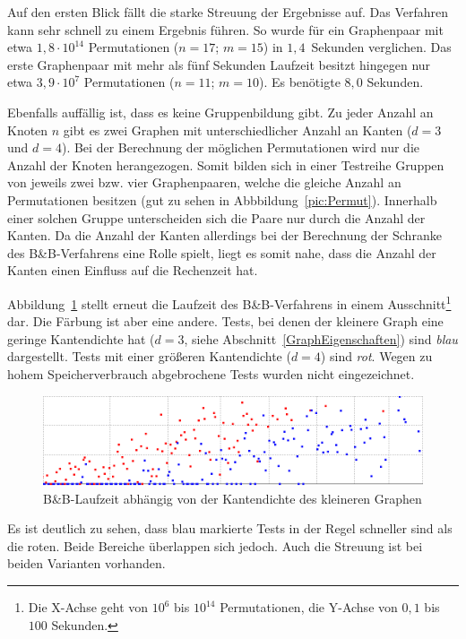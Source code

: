 Auf den ersten Blick fällt die starke Streuung der Ergebnisse auf. Das Verfahren kann 
sehr schnell zu einem Ergebnis führen. So wurde für ein Graphenpaar mit etwa $1{,}8 \cdot 
10^{14}$ Permutationen ($n=17$; $m=15$) in $1{,}4$~Sekunden verglichen. Das erste Graphenpaar 
mit mehr als fünf Sekunden Laufzeit besitzt hingegen nur etwa $3{,}9\cdot 10^7$ 
Permutationen ($n=11$; $m=10$). Es benötigte $8{,}0$ Sekunden. 

Ebenfalls auffällig ist, dass es keine Gruppenbildung gibt. Zu jeder Anzahl an Knoten 
$n$ gibt es zwei Graphen mit unterschiedlicher Anzahl an Kanten ($d=3$ und $d=4$). 
Bei der Berechnung 
der möglichen Permutationen wird nur die Anzahl der Knoten herangezogen. Somit bilden 
sich in einer Testreihe Gruppen von jeweils zwei bzw. vier Graphenpaaren, welche die gleiche  
Anzahl an Permutationen besitzen (gut zu sehen in Abbbildung~\ref{pic:Permut}). Innerhalb 
einer solchen Gruppe unterscheiden sich die Paare nur durch die Anzahl der Kanten.
Da die Anzahl der Kanten allerdings bei der Berechnung der Schranke des B\&B-Verfahrens 
eine Rolle  spielt, liegt es somit nahe, dass die Anzahl der Kanten einen Einfluss auf 
die Rechenzeit hat.

Abbildung~\ref{pic:BBcomp} stellt erneut die Laufzeit des B\&B-Verfahrens in einem 
Ausschnitt\footnote{Die X-Achse geht von $10^6$ bis $10^{14}$ Permutationen, die 
Y-Achse von $0{,}1$ bis $100$ Sekunden.} dar. Die Färbung ist aber eine andere. Tests, 
bei denen der kleinere Graph eine geringe Kantendichte hat ($d=3$, siehe 
Abschnitt~\ref{GraphEigenschaften}) sind \emph{blau} dargestellt. Tests mit einer größeren 
Kantendichte ($d=4$) sind \emph{rot}. Wegen zu hohem Speicherverbrauch abgebrochene 
Tests wurden nicht eingezeichnet.

\begin{figure}[htb]
\centering
\noindent\includegraphics[width=\linewidth,height=\textheight,
keepaspectratio]{bilder/BBcomp}
\caption{B\&B-Laufzeit abhängig von der Kantendichte des kleineren Graphen}
\label{pic:BBcomp}
\end{figure}

Es ist deutlich zu sehen, dass blau markierte Tests in der Regel schneller sind als 
die roten. Beide Bereiche überlappen sich jedoch. Auch die Streuung ist bei beiden 
Varianten vorhanden. 

